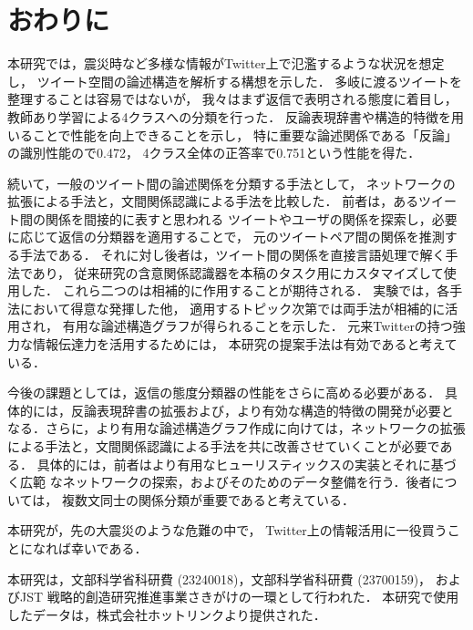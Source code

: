 \documentclass[japanese]{jnlp_1.4}
\newcommand{\addspan}[1]{}
\begin{document}
\section{おわりに}

本研究では，震災時など多様な情報がTwitter上で氾濫するような状況を想定し，
ツイート空間の論述構造を解析する構想を示した．
多岐に渡るツイートを整理することは容易ではないが，
我々はまず返信で表明される態度に着目し，教師あり学習による4クラスへの分類を行った．
反論表現辞書や構造的特徴を用いることで性能を向上できることを示し，
特に重要な論述関係である「反論」の識別性能の\addspan{$F_1$値}で0.472，
4クラス全体の正答率で0.751という性能を得た．

続いて，一般のツイート間の論述関係を分類する手法として，
ネットワークの拡張による手法と，文間関係認識による手法を比較した．
前者は，あるツイート間の関係を間接的に表すと思われる
ツイートやユーザの関係を探索し，必要に応じて返信の分類器を適用することで，
元のツイートペア間の関係を推測する手法である．
それに対し後者は，ツイート間の関係を直接言語処理で解く手法であり，
従来研究の含意関係認識器を本稿のタスク用にカスタマイズして使用した．
これら二つの\addspan{手法}は相補的に作用することが期待される．
実験では，各手法において得意な\addspan{性質を持つツイートペアの関係分類で高い性能を}発揮した他，
適用するトピック次第では両手法が相補的に活用され，
有用な論述構造グラフが得られることを示した．
元来Twitterの持つ強力な情報伝達力を活用するためには，
本研究の提案手法は有効であると考えている．

今後の課題としては，返信の態度分類器の性能をさらに高める必要がある．
具体的には，反論表現辞書の拡張および，より有効な構造的特徴の開発が必要と
なる．さらに，より有用な論述構造グラフ作成に向けては，ネットワークの拡張
による手法と，文間関係認識による手法を共に改善させていくことが必要である．
具体的には，前者はより有用なヒューリスティックスの実装とそれに基づく広範
なネットワークの探索，およびそのためのデータ整備を行う．後者については，
複数文同士の関係分類\addspan{において，文をまたいだ照応解析や共参照解析技術を取り
入れること}が重要であると考えている．

本研究が，先の大震災のような危難の中で，
Twitter上の情報活用に一役買うことになれば幸いである．


\acknowledgment
本研究は，文部科学省科研費 (23240018)，文部科学省科研費 (23700159)，
およびJST 戦略的創造研究推進事業さきがけの一環として行われた．
本研究で使用したデータは，株式会社ホットリンクより提供された．
\end{document}
